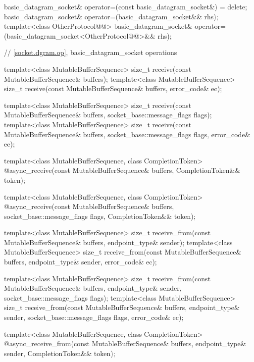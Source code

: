 \begin{codeblock}
{{    basic_datagram_socket& operator=(const basic_datagram_socket&) = delete;
    basic_datagram_socket& operator=(basic_datagram_socket&& rhs);
    template<class OtherProtocol@@>
      basic_datagram_socket& operator=(basic_datagram_socket<OtherProtocol@@>&& rhs);

    // \ref{socket.dgram.op}, basic_datagram_socket operations

    template<class MutableBufferSequence>
      size_t receive(const MutableBufferSequence& buffers);
    template<class MutableBufferSequence>
      size_t receive(const MutableBufferSequence& buffers,
                     error_code& ec);

    template<class MutableBufferSequence>
      size_t receive(const MutableBufferSequence& buffers,
                     socket_base::message_flags flags);
    template<class MutableBufferSequence>
      size_t receive(const MutableBufferSequence& buffers,
                     socket_base::message_flags flags, error_code& ec);

    template<class MutableBufferSequence, class CompletionToken>
      @\DEDUCED@ async_receive(const MutableBufferSequence& buffers,
                            CompletionToken&& token);

    template<class MutableBufferSequence, class CompletionToken>
      @\DEDUCED@ async_receive(const MutableBufferSequence& buffers,
                            socket_base::message_flags flags,
                            CompletionToken&& token);

    template<class MutableBufferSequence>
      size_t receive_from(const MutableBufferSequence& buffers,
                          endpoint_type& sender);
    template<class MutableBufferSequence>
      size_t receive_from(const MutableBufferSequence& buffers,
                          endpoint_type& sender, error_code& ec);

    template<class MutableBufferSequence>
      size_t receive_from(const MutableBufferSequence& buffers,
                          endpoint_type& sender,
                          socket_base::message_flags flags);
    template<class MutableBufferSequence>
      size_t receive_from(const MutableBufferSequence& buffers,
                          endpoint_type& sender,
                          socket_base::message_flags flags,
                          error_code& ec);

    template<class MutableBufferSequence, class CompletionToken>
      @\DEDUCED@ async_receive_from(const MutableBufferSequence& buffers,
                                 endpoint_type& sender,
                                 CompletionToken&& token);

}}
\end{codeblock}
